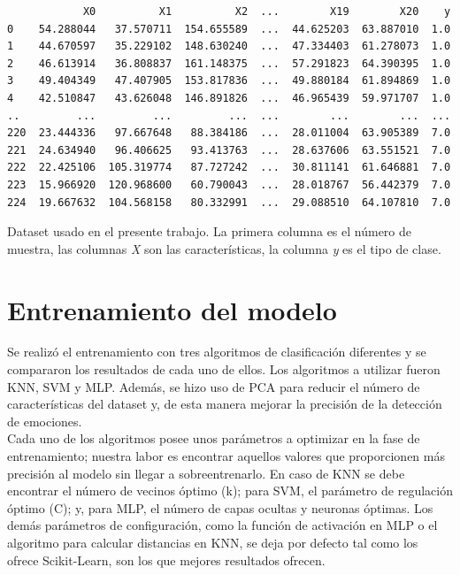 \begin{code}[h]
\begin{lstlisting}
            X0          X1          X2  ...        X19        X20    y
0    54.288044   37.570711  154.655589  ...  44.625203  63.887010  1.0
1    44.670597   35.229102  148.630240  ...  47.334403  61.278073  1.0
2    46.613914   36.808837  161.148375  ...  57.291823  64.390395  1.0
3    49.404349   47.407905  153.817836  ...  49.880184  61.894869  1.0
4    42.510847   43.626048  146.891826  ...  46.965439  59.971707  1.0
..         ...         ...         ...  ...        ...        ...  ...
220  23.444336   97.667648   88.384186  ...  28.011004  63.905389  7.0
221  24.634940   96.406625   93.413763  ...  28.637606  63.551521  7.0
222  22.425106  105.319774   87.727242  ...  30.811141  61.646881  7.0
223  15.966920  120.968600   60.790043  ...  28.018767  56.442379  7.0
224  19.667632  104.568158   80.332991  ...  29.088510  64.107810  7.0
\end{lstlisting}
\captionsetup{justification=centering}
\caption[Dataset usado en el presente trabajo. La primera columna es el número de muestra,
la columna \textit{X} son las características, la columna \textit{y} es el tipo de clase.]{Dataset usado en el presente trabajo. La primera columna es el número de muestra,
las columnas \textit{X} son las características, la columna \textit{y} es el tipo de clase.}
\label{cod:dataset}
\end{code}

\section{Entrenamiento del modelo}
\label{sec:entrenamiento}

Se realizó el entrenamiento con tres algoritmos de clasificación diferentes y se compararon los resultados de cada uno de ellos. Los algoritmos a utilizar fueron KNN, SVM y MLP. Además, se hizo uso de PCA para reducir el número de características del dataset y, de esta manera mejorar la precisión de la detección de emociones.\\

Cada uno de los algoritmos posee unos parámetros a optimizar en la fase de entrenamiento; nuestra labor es encontrar aquellos valores que proporcionen más precisión al modelo sin llegar a sobreentrenarlo. En caso de KNN se debe encontrar el número de vecinos óptimo (k); para SVM, el parámetro de regulación óptimo (C); y, para MLP, el número de capas ocultas y neuronas óptimas. Los demás parámetros de configuración, como la función de activación en MLP o el algoritmo para calcular distancias en KNN, se deja por defecto tal como los ofrece Scikit-Learn, son los que mejores resultados ofrecen.\\

